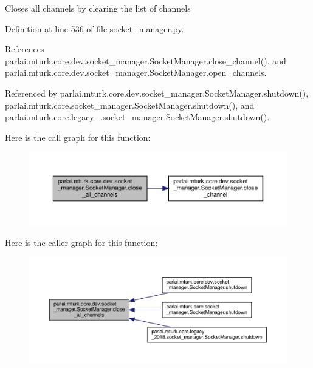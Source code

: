 \begin{DoxyVerb}Closes all channels by clearing the list of channels\end{DoxyVerb}
 

Definition at line 536 of file socket\+\_\+manager.\+py.



References parlai.\+mturk.\+core.\+dev.\+socket\+\_\+manager.\+Socket\+Manager.\+close\+\_\+channel(), and parlai.\+mturk.\+core.\+dev.\+socket\+\_\+manager.\+Socket\+Manager.\+open\+\_\+channels.



Referenced by parlai.\+mturk.\+core.\+dev.\+socket\+\_\+manager.\+Socket\+Manager.\+shutdown(), parlai.\+mturk.\+core.\+socket\+\_\+manager.\+Socket\+Manager.\+shutdown(), and parlai.\+mturk.\+core.\+legacy\+\_.\+socket\+\_\+manager.\+Socket\+Manager.\+shutdown().

Here is the call graph for this function\+:
\nopagebreak
\begin{figure}[H]
\begin{center}
\leavevmode
\includegraphics[width=350pt]{classparlai_1_1mturk_1_1core_1_1dev_1_1socket__manager_1_1SocketManager_ab8fb515ceb7db7a1c0395ca210593383_cgraph}
\end{center}
\end{figure}
Here is the caller graph for this function\+:
\nopagebreak
\begin{figure}[H]
\begin{center}
\leavevmode
\includegraphics[width=350pt]{classparlai_1_1mturk_1_1core_1_1dev_1_1socket__manager_1_1SocketManager_ab8fb515ceb7db7a1c0395ca210593383_icgraph}
\end{center}
\end{figure}
\mbox{\label{classparlai_1_1mturk_1_1core_1_1dev_1_1socket__manager_1_1SocketManager_a89ccce497152c72c2a171ef348491d89}} 
